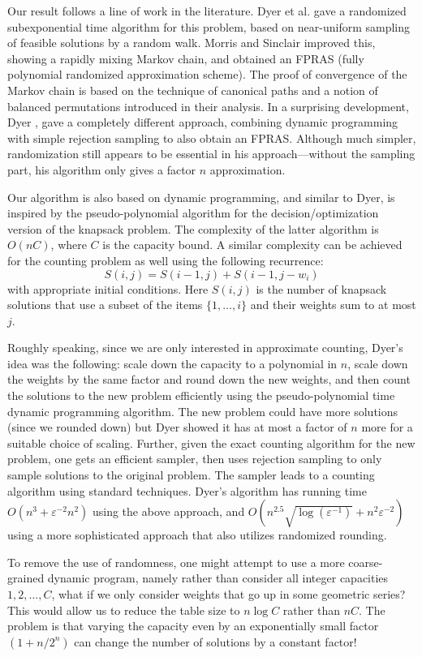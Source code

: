 \documentclass[11pt]{article}
\def\eps{\varepsilon}
\begin{document}
Our result follows a line of work in the literature. Dyer et al.
\cite{DFKKPV} gave a randomized subexponential time algorithm for
this problem, based on near-uniform sampling of feasible solutions
by a random walk. Morris and Sinclair \cite{MorrisSinclair}
improved this, showing a rapidly mixing Markov chain, and obtained
an FPRAS (fully polynomial randomized approximation scheme). The
proof of convergence of the Markov chain is based on the technique
of canonical paths and a notion of balanced permutations
introduced in their analysis. In a surprising development, Dyer
\cite{Dyer}, gave a completely different approach, combining
dynamic programming with simple rejection sampling to also obtain
an FPRAS. Although much simpler, randomization still appears to be
essential in his approach---without the sampling part, his
algorithm only gives a factor $n$ approximation.

Our algorithm is also based on dynamic programming, and similar to
Dyer, is inspired by the pseudo-polynomial algorithm for the
decision/optimization version of the knapsack problem. The
complexity of the latter algorithm is $O(nC)$, where $C$ is the
capacity bound. A similar complexity can be achieved for the
counting problem as well using the following recurrence:
\[
S(i,j) = S(i-1,j)+S(i-1,j-w_i)
\]
with appropriate initial conditions. Here $S(i,j)$ is the number
of knapsack solutions that use a subset of the items $\{1,\ldots,
i\}$ and their weights sum to at most $j$.

Roughly speaking, since we are only interested in approximate
counting, Dyer's idea was the following: scale down the capacity
to a polynomial in $n$, scale down the weights by the same factor
and round down the new weights, and then
count the solutions to the new problem efficiently using the
pseudo-polynomial time dynamic programming algorithm. The
new problem could have more solutions (since we rounded down)
but Dyer showed it has at
most a factor of $n$ more for a suitable choice of scaling.
Further, given the exact counting algorithm for the new problem,
one gets an efficient sampler, then uses rejection sampling to
only sample solutions to the original problem. The sampler leads
to a counting algorithm using standard techniques.
Dyer's algorithm has running time $O(n^3 + \eps^{-2}n^2)$ using
the above approach, and $O(n^{2.5}\sqrt{\log(\eps^{-1})} + n^2\eps^{-2})$
using a more
sophisticated approach that also utilizes randomized rounding.

To remove the use of randomness, one might attempt to use a more
coarse-grained dynamic program, namely rather than consider all
integer capacities $1,2, \ldots, C$, what if we only consider
weights that go up in some geometric series? This would allow us
to reduce the table size to $n\log C$ rather than $nC$. The
problem is that varying the capacity even by an exponentially
small factor $(1+n/2^n)$ can change the number of solutions by a
constant factor!
\end{document}

